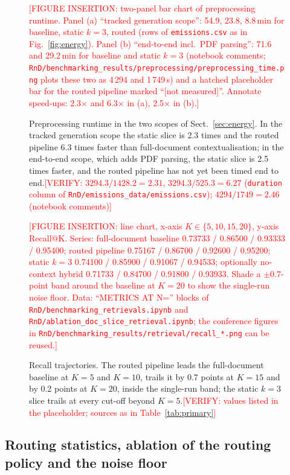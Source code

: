 \documentclass[pdflatex,sn-mathphys-num]{sn-jnl}
\makeatletter
\newcommand{\todo}[1]{\textcolor{red}{#1}}
\newcommand{\verify}[1]{\todo{[VERIFY: #1]}}
\newcommand{\Rec}[1]{Recall@#1}
\theoremstyle{thmstyleone}%
\theoremstyle{thmstylethree}%
\makeatother
\begin{document}
\begin{figure}[htbp]
  \centering
  \todo{[FIGURE INSERTION: two-panel bar chart of preprocessing runtime. Panel (a) ``tracked generation scope'': 54.9, 23.8, 8.8\,min for baseline, static $k=3$, routed (rows of \texttt{emissions.csv} as in Fig.~\ref{fig:energy}). Panel (b) ``end-to-end incl.\ PDF parsing'': 71.6 and 29.2\,min for baseline and static $k=3$ (notebook comments; \texttt{RnD/benchmarking\_results/preprocessing/preprocessing\_time.png} plots these two as 4\,294 and 1\,749\,s) and a hatched placeholder bar for the routed pipeline marked ``\todo{[not measured]}''. Annotate speed-ups: 2.3$\times$ and 6.3$\times$ in (a), 2.5$\times$ in (b).]}
  \caption{Preprocessing runtime in the two scopes of Sect.~\ref{sec:energy}. In the tracked generation scope the static slice is 2.3 times and the routed pipeline 6.3 times faster than full-document contextualisation; in the end-to-end scope, which adds PDF parsing, the static slice is 2.5 times faster, and the routed pipeline has not yet been timed end to end.\verify{$3294.3/1428.2=2.31$, $3294.3/525.3=6.27$ (\texttt{duration} column of \texttt{RnD/emissions\_data/emissions.csv}); $4294/1749=2.46$ (notebook comments)}}
  \label{fig:runtime}
\end{figure}

\begin{figure}[htbp]
  \centering
  \todo{[FIGURE INSERTION: line chart, x-axis $K\in\{5,10,15,20\}$, y-axis \Rec{K}. Series: full-document baseline 0.73733 / 0.86500 / 0.93333 / 0.95400; routed pipeline 0.75167 / 0.86700 / 0.92600 / 0.95200; static $k=3$ 0.74100 / 0.85900 / 0.91067 / 0.94533; optionally no-context hybrid 0.71733 / 0.84700 / 0.91800 / 0.93933. Shade a $\pm0.7$-point band around the baseline at $K=20$ to show the single-run noise floor. Data: ``METRICS AT N='' blocks of \texttt{RnD/benchmarking\_retrievals.ipynb} and \texttt{RnD/ablation\_doc\_slice\_retrieval.ipynb}; the conference figures in \texttt{RnD/benchmarking\_results/retrieval/recall\_*.png} can be reused.]}
  \caption{Recall trajectories. The routed pipeline leads the full-document baseline at $K=5$ and $K=10$, trails it by 0.7 points at $K=15$ and by 0.2 points at $K=20$, inside the single-run band; the static $k=3$ slice trails at every cut-off beyond $K=5$.\verify{values listed in the placeholder; sources as in Table~\ref{tab:primary}}}
  \label{fig:recall}
\end{figure}

\subsection{Routing statistics, ablation of the routing policy and the noise floor}\label{sec:routing-results}
\end{document}
